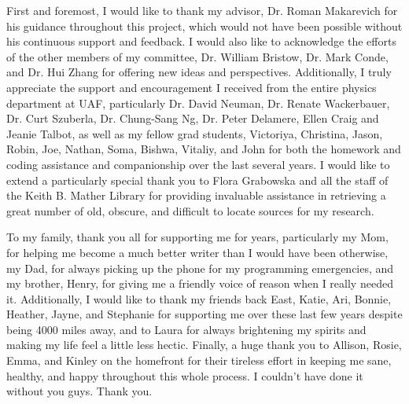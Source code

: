 
First and foremost, I would like to thank my advisor, Dr. Roman Makarevich for his guidance throughout this project, which would not have been possible without his continuous support and feedback.  I would also like to acknowledge the efforts of the other members of my committee, Dr. William Bristow, Dr. Mark Conde, and Dr. Hui Zhang for offering new ideas and perspectives.  Additionally, I truly appreciate the support and encouragement I received from the entire physics department at UAF, particularly Dr. David Neuman, Dr. Renate Wackerbauer, Dr. Curt Szuberla, Dr. Chung-Sang Ng, Dr. Peter Delamere, Ellen Craig and Jeanie Talbot, as well as my fellow grad students, Victoriya, Christina, Jason, Robin, Joe, Nathan, Soma, Bishwa, Vitaliy, and John for both the homework and coding assistance and companionship over the last several years.  I would like to extend a particularly special thank you to Flora Grabowska and all the staff of the Keith B. Mather Library for providing invaluable assistance in retrieving a great number of old, obscure, and difficult to locate sources for my research.  

To my family, thank you all for supporting me for years, particularly my Mom, for helping me become a much better writer than I would have been otherwise, my Dad, for always picking up the phone for my programming emergencies, and my brother, Henry, for giving me a friendly voice of reason when I really needed it.  Additionally, I would like to thank my friends back East, Katie, Ari, Bonnie, Heather, Jayne, and Stephanie for supporting me over these last few years despite being 4000 miles away, and to Laura for always brightening my spirits and making my life feel a little less hectic.  Finally, a huge thank you to Allison, Rosie, Emma, and Kinley on the homefront for their tireless effort in keeping me sane, healthy, and happy throughout this whole process.  I couldn't have done it without you guys.  Thank you.